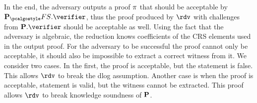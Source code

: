 \documentclass[runningheads,11pt]{llncs}
\theoremstyle{definition}
\begin{document}
In the end, the adversary outputs a proof $\pi$ that should be acceptable
by $\plonkprotfs.\verifier$, thus the proof produced by $\rdv$ with challenges
from $\plonkprot.\verifier$ should be acceptable as well. Using the fact that
the adversary is algebraic, the reduction knows coefficients of the CRS elements
used in the output proof. For the adversary to be successful the proof cannot
only be acceptable, it should also be impossible to extract a correct witness
from it. We consider two cases. In the first, the proof is acceptable, but the
statement is false. This allows $\rdv$ to break the dlog assumption.
 Another case is when the proof is acceptable, statement is valid, but the witness cannot be extracted. This proof allows $\rdv$ to break knowledge soundness of $\mathbf{P}$.
\end{document}
